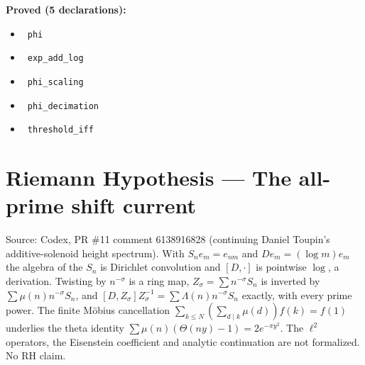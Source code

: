 \documentclass{report}
\theoremstyle{definition}
\begin{document}
\noindent\textbf{Proved (5 declarations):}
\begin{itemize}
  \item {}\leanok\ \texttt{phi}
  \item {}\leanok\ \texttt{exp\_add\_log}
  \item {}\leanok\ \texttt{phi\_scaling}
  \item {}\leanok\ \texttt{phi\_decimation}
  \item {}\leanok\ \texttt{threshold\_iff}
\end{itemize}

\section{Riemann Hypothesis --- The all-prime shift current}
Source: Codex, PR \#11 comment 6138916828 (continuing Daniel Toupin's additive-solenoid height spectrum). With $S_ne_m=e_{nm}$ and $De_m=(\log m)e_m$ the algebra of the $S_n$ is Dirichlet convolution and $[D,\cdot]$ is pointwise $\log$, a derivation. Twisting by $n^{-\sigma}$ is a ring map, $Z_\sigma=\sum n^{-\sigma}S_n$ is inverted by $\sum\mu(n)n^{-\sigma}S_n$, and $[D,Z_\sigma]Z_\sigma^{-1}=\sum\Lambda(n)n^{-\sigma}S_n$ exactly, with every prime power. The finite M\"obius cancellation $\sum_{k\le N}(\sum_{d\mid k}\mu(d))f(k)=f(1)$ underlies the theta identity $\sum\mu(n)(\Theta(ny)-1)=2e^{-\pi y^2}$. The $\ell^2$ operators, the Eisenstein coefficient and analytic continuation are not formalized. No RH claim.
\end{document}
